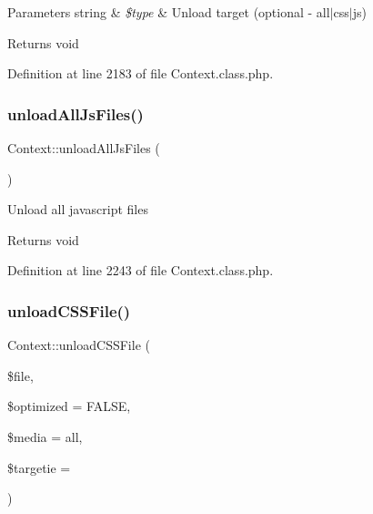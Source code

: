 \begin{DoxyParams}[1]{Parameters}
string & {\em \$type} & Unload target (optional -\/ all$\vert$css$\vert$js) \\
\hline
\end{DoxyParams}
\begin{DoxyReturn}{Returns}
void 
\end{DoxyReturn}


Definition at line 2183 of file Context.\+class.\+php.

\mbox{\label{classContext_ac8ac4c21583b50815eb01d9cc4f6405f}} 
\subsubsection{\texorpdfstring{unload\+All\+Js\+Files()}{unloadAllJsFiles()}}
{\footnotesize\ttfamily Context\+::unload\+All\+Js\+Files (\begin{DoxyParamCaption}{ }\end{DoxyParamCaption})}

Unload all javascript files

\begin{DoxyReturn}{Returns}
void 
\end{DoxyReturn}


Definition at line 2243 of file Context.\+class.\+php.

\mbox{\label{classContext_a26b1057bf312eeda0fbfcb28256c406c}} 
\subsubsection{\texorpdfstring{unload\+C\+S\+S\+File()}{unloadCSSFile()}}
{\footnotesize\ttfamily Context\+::unload\+C\+S\+S\+File (\begin{DoxyParamCaption}\item[{}]{\$file,  }\item[{}]{\$optimized = {\ttfamily FALSE},  }\item[{}]{\$media = {\ttfamily \textquotesingle{}all\textquotesingle{}},  }\item[{}]{\$targetie = {\ttfamily \textquotesingle{}\textquotesingle{}} }\end{DoxyParamCaption})}

